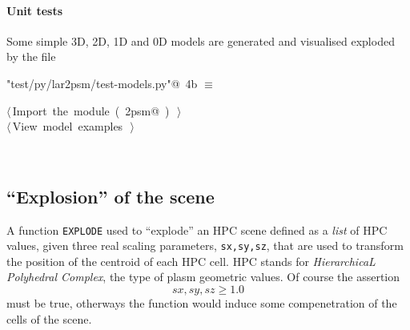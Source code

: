 \documentclass[11pt,oneside]{article}	%
\begin{document}
\paragraph{Unit tests}
Some simple 3D, 2D, 1D and 0D models are generated and visualised exploded by the file
\begin{flushleft} \small
\begin{minipage}{\linewidth} \label{scrap9}
\protect{}\verb@"test/py/lar2psm/test-models.py"@\nobreak\ {\footnotesize 4b }$\equiv$
\vspace{-1ex}
\begin{list}{}{} \item
\mbox{}\verb@@\hbox{$\langle\,$Import the module\nobreak\ ({\footnotesize {}\label{scrap10}
 }\mbox{}\verb@lar2psm@ ) {\footnotesize {}}$\,\rangle$}\verb@@\\
\mbox{}\verb@@\hbox{$\langle\,$View model examples\nobreak\ {\footnotesize {}}$\,\rangle$}\verb@@\\
\mbox{}\verb@@{\NWsep}
\end{list}
\vspace{-2ex}
\end{minipage}\\[4ex]
\end{flushleft}

\subsection{``Explosion'' of the scene}

A function \texttt{EXPLODE} used to ``explode'' an HPC scene defined as a \emph{list} of HPC values, given three real scaling parameters, \texttt{sx,sy,sz}, that are used to transform the position of the centroid of each HPC cell. HPC stands for \emph{HierarchicaL Polyhedral Complex}, the  type of plasm geometric values. Of course the assertion
\[
sx,sy,sz \geq 1.0
\]
must be true, otherways the function would induce some compenetration of the cells of the scene.
\end{document}

